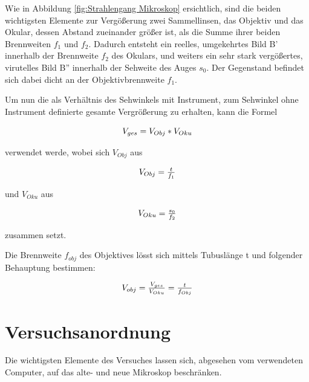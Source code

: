 \documentclass[12pt,a4paper,twoside]{article}
\begin{document}
\noindent
Wie in Abbildung \ref{fig:Strahlengang Mikroskop} ersichtlich, sind die beiden wichtigsten Elemente zur Vergößerung zwei Sammellinsen, das Objektiv und das Okular, dessen Abstand zueinander größer ist, als die Summe ihrer beiden Brennweiten $f_{1}$ und $f_{2}$. 
Dadurch entsteht ein reelles, umgekehrtes Bild B' innerhalb der Brennweite $f_{2}$ des Okulars, und weiters ein sehr stark vergößertes, virutelles Bild B'' innerhalb der Sehweite des Auges $s_{0}$. Der Gegenstand befindet sich dabei dicht an der Objektivbrennweite $f_{1}$. \newline

\noindent
Um nun die als Verhältnis des Sehwinkels mit Instrument, zum Sehwinkel ohne Instrument definierte gesamte Vergrößerung zu erhalten, kann die Formel

    \begin{equation}
        \label{eq:Gesamtvergrößerung}
        \centerline{$V_{ges}=V_{Obj}*V_{Oku}$}
    \end{equation}

\noindent
verwendet werde, wobei sich $V_{Obj}$ aus

\begin{equation}
    \label{eq:Objektivvergrößerung}
    \centerline{$V_{Obj}=\frac{t}{f_{1}}$}
\end{equation}

\noindent
und $V_{Oku}$ aus

\begin{equation}
    \label{eq:Okularvergrößerung}
    \centerline{$V_{Oku}=\frac{s_{0}}{f_{2}}$}
\end{equation}

\noindent
zusammen setzt. \newline

\noindent
Die Brennweite $f_{obj}$ des Objektives lösst sich mittels Tubuslänge t und folgender Behauptung bestimmen:

\begin{equation}
    \label{eq:Objektivbrennweite}
    \centerline{$V_{obj}=\frac{V_{ges}}{V_{Oku}}=\frac{t}{f_{Obj}}$}
\end{equation}



\section{Versuchsanordnung} %

    Die wichtigsten Elemente des Versuches lassen sich, abgesehen vom verwendeten Computer, auf das alte- und neue Mikroskop beschränken. \newline
    
\end{document}
